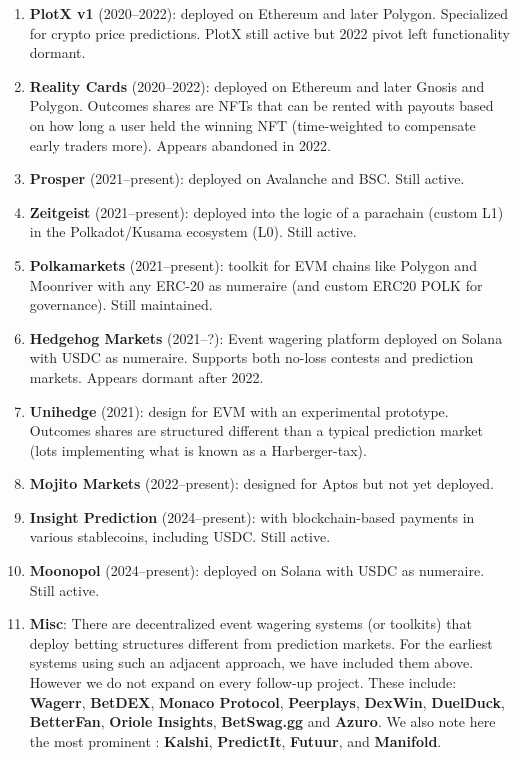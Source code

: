 \begin{enumerate}
\item \textbf{PlotX v1} (2020--2022): \depm deployed on Ethereum and later Polygon. Specialized for crypto price predictions. PlotX still active but 2022 pivot left \depm functionality dormant. 

\item \textbf{Reality Cards} (2020--2022): \depm deployed on Ethereum and later Gnosis and Polygon. Outcomes shares are NFTs that can be rented with payouts based on how long a user held the winning NFT (time-weighted to compensate early traders more). Appears abandoned in 2022.

\item \textbf{Prosper} (2021--present): \depm deployed on Avalanche and BSC. Still active.

\item \textbf{Zeitgeist} (2021--present): \depm deployed into the logic of a parachain (custom L1) in the Polkadot/Kusama ecosystem (L0). Still active.

\item \textbf{Polkamarkets} (2021--present): \depm toolkit for EVM chains like Polygon and Moonriver with any ERC-20 as numeraire (and custom ERC20 POLK for governance). Still maintained.

\item \textbf{Hedgehog Markets} (2021--?): Event wagering platform deployed on Solana with USDC as numeraire. Supports both no-loss contests and prediction markets. Appears dormant after 2022.

\item \textbf{Unihedge} (2021): \depm design for EVM with an experimental prototype. Outcomes shares are structured different than a typical prediction market (lots implementing what is known as a Harberger-tax).

\item \textbf{Mojito Markets} (2022--present): \depm designed for Aptos but not yet deployed.

\item \textbf{Insight Prediction} (2024--present): \cepm with blockchain-based payments in various stablecoins, including USDC. Still active.

\item \textbf{Moonopol} (2024--present): \depm deployed on Solana with USDC as numeraire. Still active.

\item \textbf{Misc}: There are decentralized event wagering systems (or toolkits) that deploy betting structures different from prediction markets. For the earliest systems using such an adjacent approach, we have included them above. However we do not expand on every follow-up project. These include: \textbf{Wagerr}, \textbf{BetDEX}, \textbf{Monaco Protocol}, \textbf{Peerplays}, \textbf{DexWin}, \textbf{DuelDuck}, \textbf{BetterFan}, \textbf{Oriole Insights}, \textbf{BetSwag.gg} and \textbf{Azuro}. We also note here the most prominent \cepms: \textbf{Kalshi}, \textbf{PredictIt}, \textbf{Futuur}, and \textbf{Manifold}. 

\end{enumerate}
